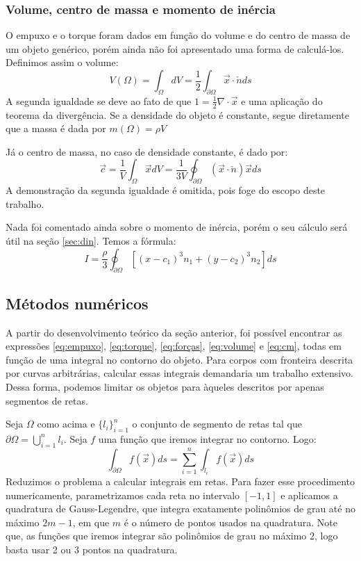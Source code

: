 \documentclass[
	12pt,				%
	oneside,			%
	a4paper,			%
	]{article}
\begin{document}
    \subsubsection{Volume, centro de massa e momento de inércia}
    O empuxo e o torque foram dados em função do volume e do centro de massa de um objeto genérico, porém ainda não foi apresentado uma forma de calculá-los. Definimos assim o volume:
    \begin{equation}
        V(\Omega) = \int_\Omega dV = \frac{1}{2} \int_{\partial \Omega} \vec{x} \cdot \check{n} ds
        \label{eq:volume}
    \end{equation}
    A segunda igualdade se deve ao fato de que $1 = \frac{1}{2} \nabla \cdot \vec{x}$ e uma aplicação do teorema da divergência. Se a densidade do objeto é constante, segue diretamente que a massa é dada por $m(\Omega) = \rho V$

    Já o centro de massa, no caso de densidade constante, é dado por:
    \begin{equation}
        \vec{c} = \frac{1}{V} \int_\Omega \vec{x} dV = \frac{1}{3V} \oint_{\partial \Omega} (\vec{x} \cdot \check{n})\vec{x} ds
        \label{eq:cm}
    \end{equation}
    A demonstração da segunda igualdade é omitida, pois foge do escopo deste trabalho.

    Nada foi comentado ainda sobre o momento de inércia, porém o seu cálculo será útil na seção \ref{sec:din}. Temos a fórmula:
    \[
        I = \frac{\rho}{3} \oint_{\partial \Omega} \left[ (x-c_1)^3 n_1 + (y-c_2)^3 n_2 \right] ds
    \]

    \subsection{Métodos numéricos}
    A partir do desenvolvimento teórico da seção anterior, foi possível encontrar as expressões \ref{eq:empuxo}, \ref{eq:torque}, \ref{eq:forças}, \ref{eq:volume} e \ref{eq:cm}, todas em função de uma integral no contorno do objeto. Para corpos com fronteira descrita por curvas arbitrárias, calcular essas integrais demandaria um trabalho extensivo. Dessa forma, podemos limitar os objetos para àqueles descritos por apenas segmentos de retas.

    Seja $\Omega$ como acima e $\{ l_i \}^n_{i=1}$ o conjunto de segmento de retas tal que $\partial \Omega = \bigcup_{i=1}^n l_i$. Seja $f$ uma função que iremos integrar no contorno. Logo:
    \begin{equation}
        \int_{\partial \Omega} f(\vec{x}) ds = \sum_{i=1}^{n} \int_{l_i} f(\vec{x}) ds
    \end{equation}
    Reduzimos o problema a calcular integrais em retas. Para fazer esse procedimento numericamente, parametrizamos cada reta no intervalo $[-1,1]$ e aplicamos a quadratura de Gauss-Legendre, que integra exatamente polinômios de grau até no máximo $2m-1$, em que $m$ é o número de pontos usados na quadratura. Note que, as funções que iremos integrar são polinômios de grau no máximo 2, logo basta usar 2 ou 3 pontos na quadratura. 
\end{document}
